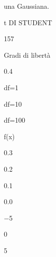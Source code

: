 \documentclass[a4paper,portrait,12pt]{article}
\begin{document}
\begin{flushleft}
una Gaussiana.
\end{flushleft}





\begin{flushleft}
 t DI STUDENT
\end{flushleft}





157





\begin{flushleft}
Gradi di libert\`{a}
\end{flushleft}





0.4





\begin{flushleft}
df=1
\end{flushleft}


\begin{flushleft}
df=10
\end{flushleft}


\begin{flushleft}
df=100
\end{flushleft}





\begin{flushleft}
f(x)
\end{flushleft}





0.3





0.2





0.1





0.0


$-$5





0





5
\end{document}
